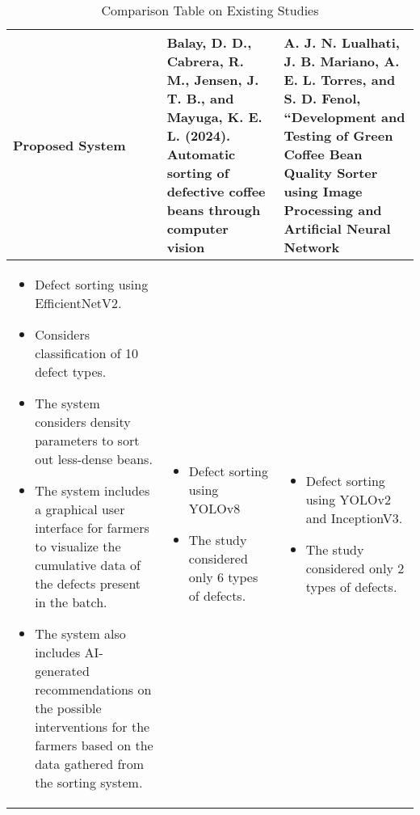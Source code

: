 \begin{center}
    \begin{longtable}{| p{5cm} | p{4cm} | p{4cm} |}
	\caption{Comparison Table on Existing Studies} 	
	\label{comparison_table_existing_studies}
	\endfirsthead
	\endhead
    \hline
    Proposed System & Balay, D. D., Cabrera, R. M., Jensen, J. T. B., and Mayuga, K. E. L. (2024). Automatic sorting of defective coffee beans through computer vision & A. J. N. Lualhati, J. B. Mariano, A. E. L. Torres, and S. D. Fenol, “Development and Testing of Green Coffee Bean Quality Sorter using Image Processing and Artificial Neural Network  \\ \hline
    
	\begin{itemize}
		\item Defect sorting using EfficientNetV2. 

		\item Considers classification of 10 defect types. 
	
		\item The system considers density parameters to sort out less-dense beans. 
	
		\item The system includes a graphical user interface for farmers to visualize the cumulative data of the defects present in the batch. 
	
		\item The system also includes AI-generated recommendations on the possible interventions for the farmers based on the data gathered from the sorting system.  
	\end{itemize}
	&
	\begin{itemize}
		\item Defect sorting using YOLOv8 

		\item The study considered only 6 types of defects. 
	\end{itemize}
	&
	\begin{itemize}
		\item Defect sorting using YOLOv2 and InceptionV3. 

		\item The study considered only 2 types of defects. 
	\end{itemize}
	\\
	\hline
    \end{longtable}
\end{center}

